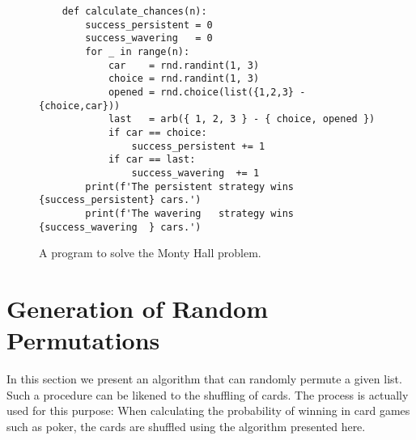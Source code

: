 \begin{figure}[!ht]
\centering
\begin{verbatim}
    def calculate_chances(n):
        success_persistent = 0
        success_wavering   = 0
        for _ in range(n):
            car    = rnd.randint(1, 3)
            choice = rnd.randint(1, 3) 
            opened = rnd.choice(list({1,2,3} - {choice,car}))
            last   = arb({ 1, 2, 3 } - { choice, opened })
            if car == choice:
                success_persistent += 1
            if car == last:
                success_wavering  += 1
        print(f'The persistent strategy wins {success_persistent} cars.')
        print(f'The wavering   strategy wins {success_wavering  } cars.')
\end{verbatim}
\vspace*{-0.3cm}
\caption{A program to solve the Monty Hall problem.}
\label{fig:Monty-Hall-Problem.ipynb}
\end{figure}





\section[Permutations]{Generation of Random Permutations}
In this section we present an algorithm that can randomly permute a given list.
Such a procedure can be likened to the shuffling of cards. The process is actually used for this purpose: When
calculating the probability of winning in card games such as poker, the cards are shuffled using the algorithm
presented here. 

